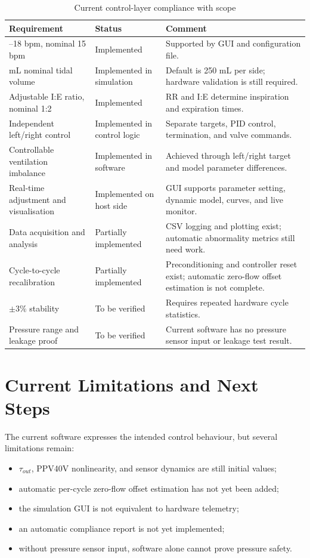 \documentclass[11pt,a4paper]{article}
\begin{document}
\begin{table}[H]
\centering
\caption{Current control-layer compliance with scope}
\label{tab:scope}
\begin{tabularx}{\textwidth}{
  >{\raggedright\arraybackslash}p{4.7cm}
  >{\centering\arraybackslash}p{2.5cm}
  X
}
\toprule
\textbf{Requirement} & \textbf{Status} & \textbf{Comment} \\
\midrule
12--18 bpm, nominal 15 bpm & Implemented & Supported by GUI and configuration file. \\
500 mL nominal tidal volume & Implemented in simulation & Default is 250 mL per side; hardware validation is still required. \\
Adjustable I:E ratio, nominal 1:2 & Implemented & RR and I:E determine inspiration and expiration times. \\
Independent left/right control & Implemented in control logic & Separate targets, PID control, termination, and valve commands. \\
Controllable ventilation imbalance & Implemented in software & Achieved through left/right target and model parameter differences. \\
Real-time adjustment and visualisation & Implemented on host side & GUI supports parameter setting, dynamic model, curves, and live monitor. \\
Data acquisition and analysis & Partially implemented & CSV logging and plotting exist; automatic abnormality metrics still need work. \\
Cycle-to-cycle recalibration & Partially implemented & Preconditioning and controller reset exist; automatic zero-flow offset estimation is not complete. \\
$\pm3\%$ stability & To be verified & Requires repeated hardware cycle statistics. \\
Pressure range and leakage proof & To be verified & Current software has no pressure sensor input or leakage test result. \\
\bottomrule
\end{tabularx}
\end{table}

\section{Current Limitations and Next Steps}

The current software expresses the intended control behaviour, but several limitations remain:

\begin{itemize}
  \item $\tau_{out}$, PPV40V nonlinearity, and sensor dynamics are still initial values;
  \item automatic per-cycle zero-flow offset estimation has not yet been added;
  \item the simulation GUI is not equivalent to hardware telemetry;
  \item an automatic compliance report is not yet implemented;
  \item without pressure sensor input, software alone cannot prove pressure safety.
\end{itemize}
\end{document}

